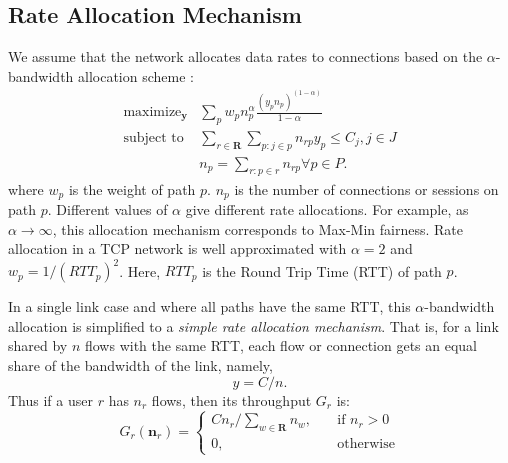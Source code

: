 \documentclass[conference]{IEEEtran}
\begin{document}
\begin{comment}
The system optimization problem is to maximize the average payoff
for all users of this overlay network. Formally, this problem is
defined as:
\begin{eqnarray}
SYSTEM \nonumber \\
&\mbox{maximize} & \sum_r B_r(d_r)    \\
&\mbox{subject to} & \mathbf{Ay\le C} \\
&& \mathbf{Hy=G} \\
&& y_p\ge 0, p\in P.
\end{eqnarray}
Since the objective function is continuous and the feasible region
is compact, an optimal solution $y$ exists. Since the feasible
region is also convex, if the functions $B^r$ are strictly
concave, then the optimal vector $\mathbf{G=Hy}$ is uniquely
defined (though $\mathbf{y}$ may not be unique).
\end{comment}


\subsection{Rate Allocation Mechanism}\label{sec:rate.alloc}


We assume that the network allocates data rates to connections
based on the $\alpha$-bandwidth allocation scheme
\cite{bonald01impact}\cite{kelly98rate}\cite{mo00fair}:
\begin{eqnarray}
\mbox{maximize}_{\mathbf{y}}
& \sum_p w_p n_p^\alpha \frac{(y_p n_p)^{(1-\alpha)}}{1-\alpha} \label{eqn:rate.alloc}\\
\mbox{subject to} & \sum_{r\in \mathbf{R}} \sum_{p: j\in p} n_{rp}
y_p \le
C_j, j\in J  \\
& n_p=\sum_{r: p\in r} n_{rp} \forall p \in P.
\end{eqnarray}
where $w_p$ is the weight of path $p$. $n_p$ is the number of
connections or sessions on path $p$. Different values of $\alpha$
give different rate allocations. For example, as $\alpha \to
\infty$, this allocation mechanism corresponds to Max-Min
fairness. Rate allocation in a TCP network is well approximated
with $\alpha=2$ and $w_p=1/(RTT_p)^2$. Here, $RTT_p$ is the Round
Trip Time (RTT) of path $p$.

In a single link case and where all paths have the same RTT, this
$\alpha$-bandwidth allocation is simplified to a \textit{simple
rate allocation mechanism}. That is, for a link shared by $n$
flows with the same RTT, each flow or connection gets an equal
share of the bandwidth of the link, namely,
\begin{equation}
y= C /n. \label{eqn:prop}
\end{equation}
Thus if a user $r$ has $n_{r}$ flows, then its throughput $G_{r}$
is:
\begin{equation}
G_{r}(\mathbf{n}_r)= \left \{
\begin{array}{ll}
C n_{r}/\sum_{w\in \mathbf{R}} n_{w}, &\quad \textrm{if $n_{r}>0$}\\
0 , &\quad \textrm{otherwise}
\end{array} \right.
\end{equation}
\end{document}
